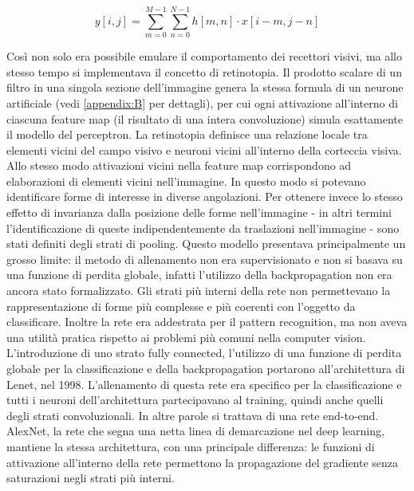 \begin{equation} \label{eq:convolution2D}
y[i,j] = \sum_{m=0}^{M-1} \sum_{n=0}^{N-1} h[m,n] \cdot x[i - m, j - n]
\end{equation}


\noindent Così non solo era possibile emulare il comportamento dei recettori visivi, ma allo stesso tempo si implementava il concetto di retinotopia. Il prodotto scalare di un filtro in una singola sezione dell'immagine genera la stessa formula di un neurone artificiale (vedi \autoref{appendix:B} per dettagli), per cui ogni attivazione all'interno di ciascuna feature map (il risultato di una intera convoluzione) simula esattamente il modello del perceptron. La retinotopia definisce una relazione locale tra elementi vicini del campo visivo e neuroni vicini all'interno della corteccia visiva. Allo stesso modo attivazioni vicini nella feature map corrispondono ad elaborazioni di elementi vicini nell'immagine. In questo modo si potevano identificare forme di interesse in diverse angolazioni. Per ottenere invece lo stesso effetto di invarianza dalla posizione delle forme nell'immagine - in altri termini l'identificazione di queste indipendentemente da traslazioni nell'immagine - sono stati definiti degli strati di pooling. Questo modello presentava principalmente un grosso limite: il metodo di allenamento non era supervisionato e non si basava su una funzione di perdita globale, infatti l'utilizzo della backpropagation non era ancora stato formalizzato. Gli strati più interni della rete non permettevano la rappresentazione di forme più complesse e più coerenti con l'oggetto da classificare. Inoltre la rete era addestrata per il pattern recognition, ma non aveva una utilità pratica rispetto ai problemi più comuni nella computer vision. L'introduzione di uno strato fully connected, l'utilizzo di una funzione di perdita globale per la classificazione e della backpropagation portarono all'architettura di Lenet, nel 1998. L'allenamento di questa rete era specifico per la classificazione e tutti i neuroni dell'architettura partecipavano al training, quindi anche quelli degli strati convoluzionali. In altre parole si trattava di una rete end-to-end. AlexNet, la rete che segna una netta linea di demarcazione nel deep learning, mantiene la stessa architettura, con una principale differenza: le funzioni di attivazione all'interno della rete permettono la propagazione del gradiente senza saturazioni negli strati più interni. 

